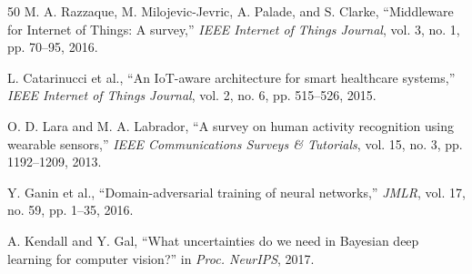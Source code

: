 \documentclass[journal]{IEEEtran}
\begin{document}
\begin{thebibliography}{50}
M. A. Razzaque, M. Milojevic-Jevric, A. Palade, and S. Clarke, ``Middleware for Internet of Things: A survey,'' \emph{IEEE Internet of Things Journal}, vol. 3, no. 1, pp. 70--95, 2016.

L. Catarinucci et al., ``An IoT-aware architecture for smart healthcare systems,'' \emph{IEEE Internet of Things Journal}, vol. 2, no. 6, pp. 515--526, 2015.

O. D. Lara and M. A. Labrador, ``A survey on human activity recognition using wearable sensors,'' \emph{IEEE Communications Surveys \& Tutorials}, vol. 15, no. 3, pp. 1192--1209, 2013.

Y. Ganin et al., ``Domain-adversarial training of neural networks,'' \emph{JMLR}, vol. 17, no. 59, pp. 1--35, 2016.

A. Kendall and Y. Gal, ``What uncertainties do we need in Bayesian deep learning for computer vision?'' in \emph{Proc. NeurIPS}, 2017.

\end{thebibliography}
\end{document}
